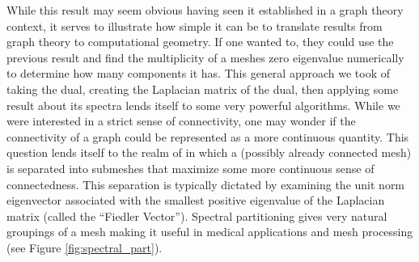 \documentclass[11pt]{article}
\begin{document}
While this result may seem obvious having seen it established in a graph theory context, it serves to illustrate how simple it can be to translate results from graph theory to computational geometry. If one wanted to, they could use the previous result and find the multiplicity of a meshes zero eigenvalue numerically to determine how many components it has. This general approach we took of taking the dual, creating the Laplacian matrix of the dual, then applying some result about its spectra lends itself to some very powerful algorithms. While we were interested in a strict sense of connectivity, one may wonder if the connectivity of a graph could be represented as a more continuous quantity. This question lends itself to the realm of  in which a (possibly already connected mesh) is separated into submeshes that maximize some more continuous sense of connectedness. This separation is typically dictated by examining the unit norm eigenvector associated with the smallest positive eigenvalue of the Laplacian matrix (called the ``Fiedler Vector''). Spectral partitioning gives very natural groupings of a mesh making it useful in medical applications \cite{10.1007/978-3-642-15705-9_41} and mesh processing \cite{bao2023spectral} (see Figure \ref{fig:spectral_part}).
\end{document}
